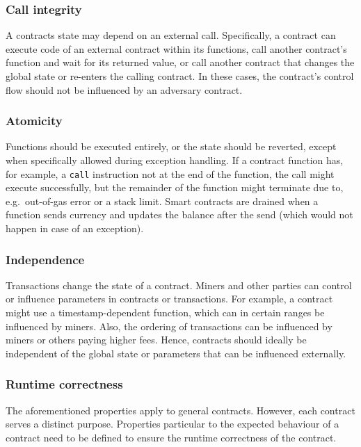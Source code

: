 \subsubsection{Call integrity}
A contracts state may depend on an external call. Specifically, a contract can execute code of an external contract within its functions, call another contract's function and wait for its returned value, or call another contract that changes the global state or re-enters the calling contract.
In these cases, the contract's control flow should not be influenced by an adversary contract.

\subsubsection{Atomicity}
Functions should be executed entirely, or the state should be reverted, except when specifically allowed during exception handling.
If a contract function has, for example, a \texttt{call} instruction not at the end of the function, the call might execute successfully, but the remainder of the function might terminate due to, e.g.\ out-of-gas error or a stack limit. Smart contracts are drained when a function sends currency and updates the balance after the send (which would not happen in case of an exception).

\subsubsection{Independence}
Transactions change the state of a contract. Miners and other parties can control or influence parameters in contracts or transactions. For example, a contract might use a timestamp-dependent function, which can in certain ranges be influenced by miners. Also, the ordering of transactions can be influenced by miners or others paying higher fees. Hence, contracts should ideally be independent of the global state or parameters that can be influenced externally.

\subsubsection{Runtime correctness}
The aforementioned properties apply to general contracts. However, each contract serves a distinct purpose. Properties particular to the expected behaviour of a contract need to be defined to ensure the runtime correctness of the contract.





